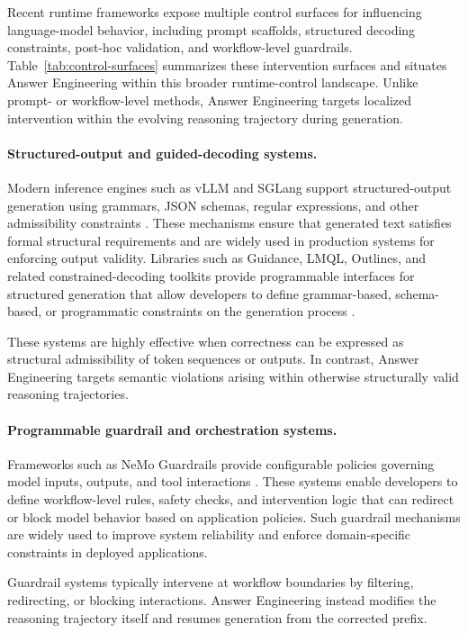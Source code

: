 \documentclass[twocolumn]{article}
\begin{document}
Recent runtime frameworks expose multiple control surfaces for influencing
language-model behavior, including prompt scaffolds, structured decoding
constraints, post-hoc validation, and workflow-level guardrails.
Table~\ref{tab:control-surfaces} summarizes these intervention surfaces and
situates Answer Engineering within this broader runtime-control landscape.
Unlike prompt- or workflow-level methods, Answer Engineering targets localized
intervention within the evolving reasoning trajectory during generation.

\paragraph{Structured-output and guided-decoding systems.}
Modern inference engines such as vLLM and SGLang support structured-output
generation using grammars, JSON schemas, regular expressions, and other
admissibility constraints \parencite{kwon2023vllm,zheng2024sglang}. These
mechanisms ensure that generated text satisfies formal structural requirements
and are widely used in production systems for enforcing output validity.
Libraries such as Guidance, LMQL, Outlines, and related
constrained-decoding toolkits provide programmable interfaces for structured
generation that allow developers to define grammar-based, schema-based, or
programmatic constraints on the generation process
\parencite{guidance2023,beurer2023lmql,koo2024automata}.

These systems are highly effective when correctness can be expressed as
structural admissibility of token sequences or outputs. In contrast, Answer
Engineering targets semantic violations arising within otherwise structurally
valid reasoning trajectories.

\paragraph{Programmable guardrail and orchestration systems.}
Frameworks such as NeMo Guardrails provide configurable policies governing model
inputs, outputs, and tool interactions \parencite{nemoguardrails2023}. These
systems enable developers to define workflow-level rules, safety checks, and
intervention logic that can redirect or block model behavior based on
application policies. Such guardrail mechanisms are widely used to improve
system reliability and enforce domain-specific constraints in deployed
applications.

Guardrail systems typically intervene at workflow boundaries by filtering,
redirecting, or blocking interactions. Answer Engineering instead modifies the
reasoning trajectory itself and resumes generation from the corrected prefix.
\end{document}
